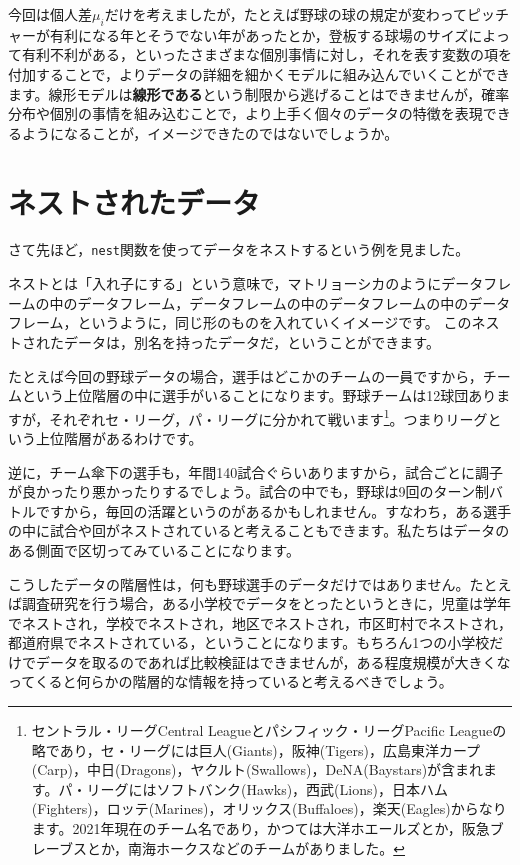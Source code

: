 \documentclass{ltjsbook}
\begin{document}
今回は個人差$\mu_i$だけを考えましたが，たとえば野球の球の規定が変わってピッチャーが有利になる年とそうでない年があったとか，登板する球場のサイズによって有利不利がある，といったさまざまな個別事情に対し，それを表す変数の項を付加することで，よりデータの詳細を細かくモデルに組み込んでいくことができます。線形モデルは\textbf{線形である}という制限から逃げることはできませんが，確率分布や個別の事情を組み込むことで，より上手く個々のデータの特徴を表現できるようになることが，イメージできたのではないでしょうか。

\section{ネストされたデータ}
さて先ほど，\verb|nest|関数を使ってデータをネストするという例を見ました。

ネストとは「入れ子にする」という意味で，マトリョーシカのようにデータフレームの中のデータフレーム，データフレームの中のデータフレームの中のデータフレーム，というように，同じ形のものを入れていくイメージです。
このネストされたデータは，別名を持ったデータだ，ということができます。

たとえば今回の野球データの場合，選手はどこかのチームの一員ですから，チームという上位階層の中に選手がいることになります。野球チームは12球団ありますが，それぞれセ・リーグ，パ・リーグに分かれて戦います\footnote{セントラル・リーグCentral Leagueとパシフィック・リーグPacific Leagueの略であり，セ・リーグには巨人(Giants)，阪神(Tigers)，広島東洋カープ(Carp)，中日(Dragons)，ヤクルト(Swallows)，DeNA(Baystars)が含まれます。パ・リーグにはソフトバンク(Hawks)，西武(Lions)，日本ハム(Fighters)，ロッテ(Marines)，オリックス(Buffaloes)，楽天(Eagles)からなります。2021年現在のチーム名であり，かつては大洋ホエールズとか，阪急ブレーブスとか，南海ホークスなどのチームがありました。}。つまりリーグという上位階層があるわけです。

逆に，チーム傘下の選手も，年間140試合ぐらいありますから，試合ごとに調子が良かったり悪かったりするでしょう。試合の中でも，野球は9回のターン制バトルですから，毎回の活躍というのがあるかもしれません。すなわち，ある選手の中に試合や回がネストされていると考えることもできます。私たちはデータのある側面で区切ってみていることになります。

こうしたデータの階層性は，何も野球選手のデータだけではありません。たとえば調査研究を行う場合，ある小学校でデータをとったというときに，児童は学年でネストされ，学校でネストされ，地区でネストされ，市区町村でネストされ，都道府県でネストされている，ということになります。もちろん1つの小学校だけでデータを取るのであれば比較検証はできませんが，ある程度規模が大きくなってくると何らかの階層的な情報を持っていると考えるべきでしょう。
\end{document}
